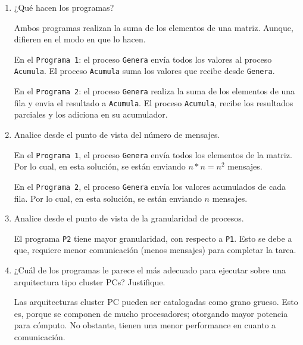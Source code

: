 \documentclass[a4paper, 10pt]{article}
\newenvironment{QandA}{
    \begin{enumerate}\bfseries}
    {\end{enumerate}
}
\newenvironment{answered}{\par\normalfont}{}
\begin{document}
\begin{QandA}
\begin{enumerate}
\item ¿Qué hacen los programas?

\begin{answered}
Ambos programas realizan la suma de los elementos de una matriz. Aunque, difieren en el modo en que lo hacen.

En el \lstinline{Programa 1}: el proceso \lstinline{Genera} envía todos los valores al proceso \lstinline{Acumula}. El proceso \lstinline{Acumula} suma los valores que recibe desde \lstinline{Genera}.

En el \lstinline{Programa 2}: el proceso \lstinline{Genera} realiza la suma de los elementos de una fila y envia el resultado a \lstinline{Acumula}. El proceso \lstinline{Acumula}, recibe los resultados parciales y los adiciona en su acumulador.
\end{answered}


\item Analice desde el punto de vista del número de mensajes.

\begin{answered}
En el \lstinline{Programa 1}, el proceso \lstinline{Genera} envía todos los elementos de la matriz. Por lo cual, en esta solución, se están enviando $n*n = n^2$ mensajes.

En el \lstinline{Programa 2}, el proceso \lstinline{Genera} envía los valores acumulados de cada fila. Por lo cual, en esta solución, se están enviando $n$ mensajes.

\end{answered}

\item Analice desde el punto de vista de la granularidad de procesos.

\begin{answered}
El programa \lstinline{P2} tiene mayor granularidad, con respecto a \lstinline{P1}. Esto se debe a que, requiere menor comunicación (menos mensajes) para completar la tarea.
\end{answered}

\item ¿Cuál de los programas le parece el más adecuado para ejecutar sobre una arquitectura tipo cluster PCs? Justifique. 

\begin{answered}
Las arquitecturas cluster PC pueden ser catalogadas como grano grueso. Esto es, porque se componen de mucho procesadores; otorgando mayor potencia para cómputo. No obstante, tienen una menor performance en cuanto a comunicación.


\end{answered}
\end{enumerate}
\end{QandA}
\end{document}
